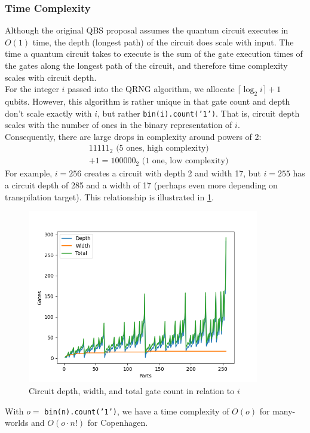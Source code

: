 \documentclass[12pt]{article}
\begin{document}
\subsubsection{Time Complexity}
Although the original QBS proposal assumes the quantum circuit executes in $O(1)$ time, the depth (longest path) of the circuit does scale with input. The time a quantum circuit takes to execute is the sum of the gate execution times of the gates along the longest path of the circuit, and therefore time complexity scales with circuit depth. \\
For the integer $i$ passed into the QRNG algorithm, we allocate $\lceil \log_2 i \rceil + 1$ qubits. However, this algorithm is rather unique in that gate count and depth don't scale exactly with $i$, but rather \texttt{bin(i).count('1')}. That is, circuit depth scales with the number of ones in the binary representation of $i$. \\
Consequently, there are large drops in complexity around powers of 2:
\begin{align*}
&11111_2 \text{  (5 ones, high complexity)} \\ &+ 1 = 100000_2 \text{  (1 one, low complexity)}
\end{align*}
For example, $i = 256$ creates a circuit with depth 2 and width 17, but $i = 255$ has a circuit depth of 285 and a width of 17 (perhaps even more depending on transpilation target). This relationship is illustrated in \ref{fig:resources}.

\begin{figure}[h]
    \centering
    \capstart
    \includegraphics[width=0.9\textwidth]{images/resources.png}
    \caption{Circuit depth, width, and total gate count in relation to $i$}
    \label{fig:resources}
\end{figure}
\vspace{10mm}
\noindent With $o = $ \texttt{bin(n).count('1')}, we have a time complexity of $O(o)$ for many-worlds and $O(o \cdot n!)$ for Copenhagen.
\end{document}
